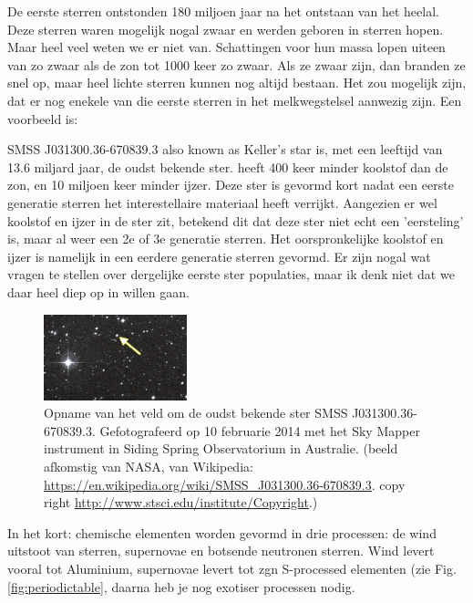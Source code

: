 \documentclass[11pt,fleqn]{book} %
\begin{document}
De eerste sterren ontstonden 180 miljoen jaar na het ontstaan van het
heelal. Deze sterren waren mogelijk nogal
zwaar en werden geboren in sterren hopen. Maar heel veel weten we er
niet van. Schattingen voor hun massa lopen uiteen van zo zwaar als de
zon tot 1000 keer zo zwaar. Als ze zwaar zijn, dan branden ze snel op,
maar heel lichte sterren kunnen nog altijd bestaan. Het zou mogelijk
zijn, dat er nog enekele van die eerste sterren in het melkwegstelsel
aanwezig zijn. Een voorbeeld is: 

SMSS J031300.36-670839.3 also known as Keller's star is, met een
leeftijd van 13.6 miljard jaar, de oudst bekende ster.  heeft 400 keer
minder koolstof dan de zon, en 10 miljoen keer minder ijzer.  Deze
ster is gevormd kort nadat een eerste generatie sterren het
interestellaire materiaal heeft verrijkt. Aangezien er wel koolstof en ijzer in de ster zit, betekend dit dat deze ster niet echt een 'eersteling' is, maar al weer een 2e of 3e generatie sterren. Het oorspronkelijke koolstof en ijzer is namelijk in een eerdere generatie sterren gevormd.  Er zijn nogal wat vragen te stellen over dergelijke eerste ster populaties, maar ik denk niet dat we daar heel diep op in willen gaan.

\begin{figure}[h]
    \centering
    \includegraphics[width=0.37\textwidth]{Pictures/OldestStar-SM0313-SMSSJ031300366708393-20140210.png}
    \caption{Opname van het veld om de oudst bekende ster SMSS
      J031300.36-670839.3.  Gefotografeerd op 10 februarie 2014 met
      het Sky Mapper instrument in Siding Spring Observatorium in
      Australie.  (beeld afkomstig van NASA, van Wikipedia:
      \url{https://en.wikipedia.org/wiki/SMSS_J031300.36-670839.3}.
      copy right \url{http://www.stsci.edu/institute/Copyright}.) }
    \label{fig:pca}
\end{figure}

In het kort: chemische elementen worden gevormd in drie processen: de
wind uitstoot van sterren, supernovae en botsende neutronen sterren.
Wind levert vooral tot Aluminium, supernovae levert tot zgn S-processed elementen (zie Fig. \ref{fig:periodictable}, daarna heb je nog exotiser processen nodig.
\end{document}
